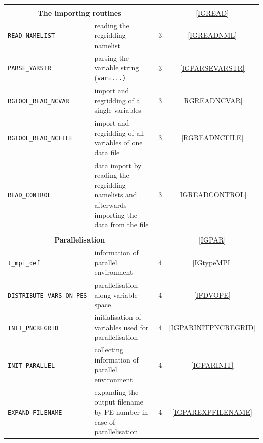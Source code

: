 \documentclass[11pt,twoside]{report}
\begin{document}
\begin{longtable}{|p{5cm}p{8.5cm}cc|}
& & & \\
\multicolumn{2}{|c}{\bf \Large The importing routines}
& & \ref{IGREAD} \\ \hline
{\color{blue} \tt READ\_NAMELIST} & reading the regridding namelist &
3 & \ref{IGREADNML} \\\hline
{\color{blue} \tt PARSE\_VARSTR} & parsing the variable string
(\tt var=...) &
3 & \ref{IGPARSEVARSTR} \\\hline
{\color{blue} \tt RGTOOL\_READ\_NCVAR} &  import and regridding of a single
variables & 3 & \ref{RGREADNCVAR} \\\hline
{\color{blue} \tt RGTOOL\_READ\_NCFILE} &  import and regridding of all
variables of one data file & 3 & \ref{RGREADNCFILE} \\\hline
{\color{blue} \tt READ\_CONTROL} &  data import by reading the
regridding namelists and afterwards importing the data from the file & 3 & \ref{IGREADCONTROL} \\\hline
& & & \\
\multicolumn{2}{|c}{\bf \Large Parallelisation}
& & \ref{IGPAR} \\ \hline
{\color{red} \tt t\_mpi\_def} & information of parallel
environment & 4 &\ref{IGtypeMPI}\\ \hline
{\color{blue} \tt DISTRIBUTE\_VARS\_ON\_PES} &  parallelisation along
variable space &  4 & \ref{IFDVOPE} \\\hline
{\color{blue} \tt INIT\_PNCREGRID} & initialisation of variables used for
parallelisation & 4  & \ref{IGPARINITPNCREGRID} \\\hline
{\color{blue} \tt INIT\_PARALLEL} & collecting information of parallel environment &
4 & \ref{IGPARINIT} \\\hline
{\color{blue} \tt EXPAND\_FILENAME} & expanding the output filename by PE number in case of
parallelisation &  4 & \ref{IGPAREXPFILENAME} \\\hline
\end{longtable}
\vspace*{0.5cm}
\end{document}
